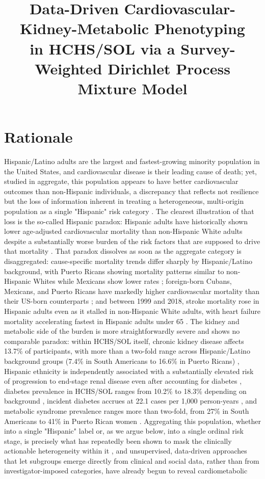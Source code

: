 \documentclass[11pt]{article}
\title{Data-Driven Cardiovascular-Kidney-Metabolic Phenotyping\\
in HCHS/SOL via a Survey-Weighted Dirichlet Process Mixture Model}
\author{}
\date{}
\begin{document}
\maketitle

\section{Rationale}

Hispanic/Latino adults are the largest and fastest-growing minority population in the United States, and cardiovascular disease is their leading cause of death; yet, studied in aggregate, this population appears to have better cardiovascular outcomes than non-Hispanic individuals, a discrepancy that reflects not resilience but the loss of information inherent in treating a heterogeneous, multi-origin population as a single "Hispanic" risk category \citep{blumer2021heterogeneity}. The clearest illustration of that loss is the so-called Hispanic paradox: Hispanic adults have historically shown lower age-adjusted cardiovascular mortality than non-Hispanic White adults despite a substantially worse burden of the risk factors that are supposed to drive that mortality \citep{cortesbergoderi2013paradox,balfour2016cvd}. That paradox dissolves as soon as the aggregate category is disaggregated: cause-specific mortality trends differ sharply by Hispanic/Latino background, with Puerto Ricans showing mortality patterns similar to non-Hispanic Whites while Mexicans show lower rates \citep{rodriguez2017disaggregation}; foreign-born Cubans, Mexicans, and Puerto Ricans have markedly higher cardiovascular mortality than their US-born counterparts \citep{rodriguez2017nativity}; and between 1999 and 2018, stroke mortality rose in Hispanic adults even as it stalled in non-Hispanic White adults, with heart failure mortality accelerating fastest in Hispanic adults under 65 \citep{khan2022trends}. The kidney and metabolic side of the burden is more straightforwardly severe and shows no comparable paradox: within HCHS/SOL itself, chronic kidney disease affects 13.7\% of participants, with more than a two-fold range across Hispanic/Latino background groups (7.4\% in South Americans to 16.6\% in Puerto Ricans) \citep{ricardo2015prevalence}, Hispanic ethnicity is independently associated with a substantially elevated risk of progression to end-stage renal disease even after accounting for diabetes \citep{peralta2006risks,desai2018ckdesrd}, diabetes prevalence in HCHS/SOL ranges from 10.2\% to 18.3\% depending on background \citep{schneiderman2014diabetes}, incident diabetes accrues at 22.1 cases per 1,000 person-years \citep{cordero2022incidence}, and metabolic syndrome prevalence ranges more than two-fold, from 27\% in South Americans to 41\% in Puerto Rican women \citep{heiss2014prevalence}. Aggregating this population, whether into a single "Hispanic" label or, as we argue below, into a single ordinal risk stage, is precisely what has repeatedly been shown to mask the clinically actionable heterogeneity within it \citep{lopezgolden2014disparities}, and unsupervised, data-driven approaches that let subgroups emerge directly from clinical and social data, rather than from investigator-imposed categories, have already begun to reveal cardiometabolic 
\end{document}
